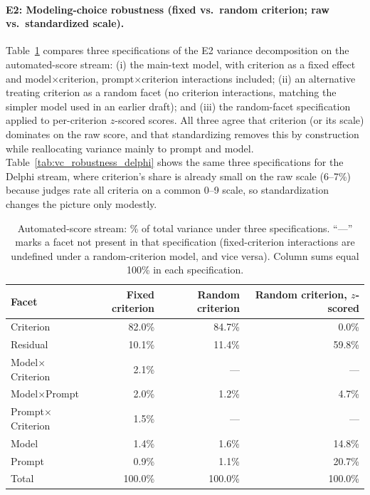 \documentclass[10pt]{article}
\begin{document}
\paragraph{E2: Modeling-choice robustness (fixed vs.\ random criterion; raw
vs.\ standardized scale).}
Table~\ref{tab:vc_robustness} compares three specifications of the E2
variance decomposition on the automated-score stream: (i) the main-text
model, with criterion as a fixed effect and model$\times$criterion,
prompt$\times$criterion interactions included; (ii) an alternative treating
criterion as a random facet (no criterion interactions, matching the simpler
model used in an earlier draft); and (iii) the random-facet specification
applied to per-criterion $z$-scored scores. All three agree that criterion
(or its scale) dominates on the raw score, and that standardizing removes
this by construction while reallocating variance mainly to prompt and model.
Table~\ref{tab:vc_robustness_delphi} shows the same three specifications for
the Delphi stream, where criterion's share is already small on the raw scale
(6--7\%) because judges rate all criteria on a common 0--9 scale, so
standardization changes the picture only modestly.

\begin{table}[H]
\centering
\small
\caption{Automated-score stream: \% of total variance under three
specifications. ``---'' marks a facet not present in that specification
(fixed-criterion interactions are undefined under a random-criterion model,
and vice versa). Column sums equal 100\% in each specification.}
\label{tab:vc_robustness}
\begin{tabular}{lrrr}
\toprule
Facet & Fixed criterion & Random criterion & Random criterion, $z$-scored \\
\midrule
Criterion                 & 82.0\% & 84.7\% & 0.0\% \\
Residual                  & 10.1\% & 11.4\% & 59.8\% \\
Model$\times$Criterion    &  2.1\% & --- & --- \\
Model$\times$Prompt       &  2.0\% &  1.2\% &  4.7\% \\
Prompt$\times$Criterion   &  1.5\% & --- & --- \\
Model                     &  1.4\% &  1.6\% & 14.8\% \\
Prompt                    &  0.9\% &  1.1\% & 20.7\% \\
\midrule
Total                     & 100.0\% & 100.0\% & 100.0\% \\
\bottomrule
\end{tabular}
\end{table}
\end{document}
